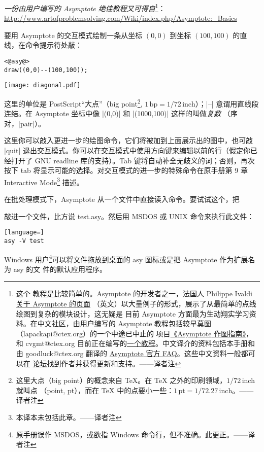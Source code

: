 \documentclass{ctexbook}
\newcommand*\prgname[1]{\textsf{#1}}
\newcommand\transnote[1]{\footnote{#1——译者注}}
\begin{document}
\emph{一份由用户编写的 \prgname{Asymptote} 绝佳教程又可得自}\transnote{这个
教程是比较简单的。\prgname{Asymptote} 的开发者之一，法国人 Philippe Ivaldi
\href{http://piprim.tuxfamily.org/asymptote/}{关于 \prgname{Asymptote} 的页面}
（英文）以大量例子的形式，展示了从最简单的点线绘图到复杂的模块设计，这无疑是
目前 \prgname{Asymptote} 方面最为生动翔实学习资料。在中文社区，由用户编写的
\prgname{Asymptote} 教程包括较早莫图（lapackapi@ctex.org）的一个中途已中止的
项目\href{http://gzmfig.googlepages.com/}{《\prgname{Asymptote} 作图指南》}，
和 cvgmt@ctex.org 目前正在编写的\href{http://code.google.com/p/asy4cn/}
{一个教程}。中文译介的资料包括本手册和由 goodluck@ctex.org 翻译的
\href{http://bbs.ctex.org/viewthread.php?tid=47344}
{\prgname{Asymptote} 官方 FAQ}。这些中文资料一般都可以在
\href{http://bbs.ctex.org}{\CTeX{} 论坛}找到作者并获得更新和支持。}：
\url{http://www.artofproblemsolving.com/Wiki/index.php/Asymptote:_Basics}

要用 \prgname{Asymptote} 的交互模式绘制一条从坐标 $(0, 0)$ 到坐标
$(100, 100)$ 的直线，在命令提示符处敲：
\begin{lstlisting}
<@asy@>
draw((0,0)--(100,100));
\end{lstlisting}
\begin{center}
  \texttt{[image: diagonal.pdf]}
\end{center}

这里的单位是 \prgname{PostScript}“大点”（big point\transnote{这里大点（big
point）的概念来自 \TeX{}。在 \TeX{} 之外的印刷领域，$1/72$\,inch 就叫点
（point, pt），而在 \TeX{} 中的点要小一些：$1\,\text{pt} = 1/72.27\,\text{inch}$。},
$1\,\text{bp} = 1/72\,\text{inch}$）；|--| 意谓用直线段连结。在
\prgname{Asymptote} 坐标中像 |(0,0)| 和 |(1000,100)| 这样的叫做\emph{复数}%
（序对，|pair|）。

这里你可以敲入更进一步的绘图命令，它们将被加到上面展示出的图中，也可敲 |quit|
退出交互模式。你可以在交互模式中使用方向键来编辑以前的行（假定你已经打开了
GNU \prgname{readline} 库的支持）。Tab 键将自动补全无歧义的词；否则，再次按下
tab 将显示可能的选择。对交互模式的进一步的特殊命令在原手册第 9 章 Interactive
Mode\transnote{本译本未包括此章。} 描述。

在批处理模式下，\prgname{Asymptote} 从一个文件中直接读入命令。要试试这个，把

敲进一个文件，比方说 \prgname{test.asy}。然后用 \prgname{MSDOS} 或
\prgname{UNIX} 命令来执行此文件：
\begin{lstlisting}[language=]
asy -V test
\end{lstlisting}
\prgname{Windows} 用户\transnote{原手册误作 \prgname{MSDOS}，或欲指
\prgname{Windows} 命令行，但不准确。此更正。}可以将文件拖放到桌面的
\prgname{asy} 图标或是把 \prgname{Asymptote} 作为扩展名为 \prgname{asy} 的文
件的默认应用程序。
\end{document}
